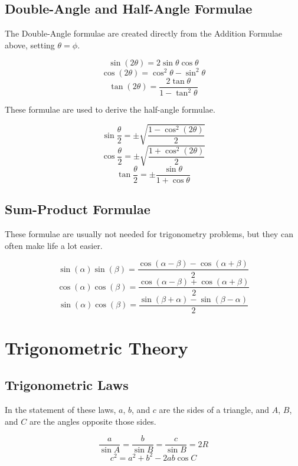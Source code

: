 \documentclass[12pt, letterpaper]{article}
\begin{document}
\subsection{Double-Angle and Half-Angle Formulae}

\par The Double-Angle formulae are created directly from the Addition Formulae above, setting $\theta = \phi$.

\[
\sin{(2\theta)} = 2\sin{\theta}\cos{\theta}
\]
\[
\cos{(2\theta)} = \cos^2{\theta} - \sin^2{\theta}
\]
\[
\tan{(2\theta)} = \frac{2\tan{\theta}}{1-\tan^2{\theta}}
\]

\par These formulae are used to derive the half-angle formulae.

\[
\sin{\frac{\theta}{2}} = \pm\sqrt{\frac{1-\cos^2{(2\theta)}}{2}}
\]
\[
\cos{\frac{\theta}{2}} = \pm\sqrt{\frac{1+\cos^2{(2\theta)}}{2}}
\]
\[
\tan{\frac{\theta}{2}} = \pm\frac{\sin{\theta}}{1+\cos{\theta}}
\]

\subsection{Sum-Product Formulae}

\par These formulae are usually not needed for trigonometry problems, but they can often make life a lot easier.

\[
\sin(\alpha)\sin(\beta) = \frac{\cos(\alpha - \beta) - \cos(\alpha
  + \beta)}{2}
\]
\[
\cos(\alpha)\cos(\beta) = \frac{\cos(\alpha - \beta) + \cos(\alpha
  + \beta)}{2}
\]
\[
\sin(\alpha)\cos(\beta) = \frac{\sin(\beta + \alpha) - \sin(\beta
  - \alpha)}{2}
\]

\section{Trigonometric Theory}

\subsection{Trigonometric Laws}

\par In the statement of these laws, $a$, $b$, and $c$ are the sides of a triangle, and $A$, $B$, and $C$ are the angles opposite those sides.

\[
\frac{a}{\sin{A}} = \frac{b}{\sin{B}} = \frac{c}{\sin{B}} = 2R
\]
\[
c^2 = a^2 + b^2 - 2ab\cos{C}
\]
\end{document}
